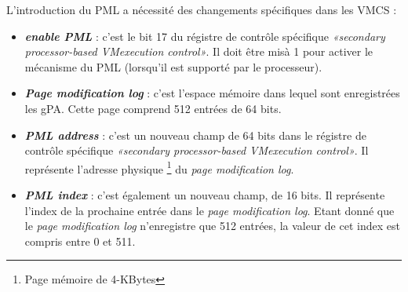 \par\noindent L'introduction du PML a nécessité des changements spécifiques dans les \acs{VMCS}
 : 
\begin{itemize}
    \item \textit{\textbf{enable PML}} : c'est le bit 17 du régistre de contrôle spécifique \textit{«secondary processor-based VMexecution control»}. Il doit être misà 1 pour activer le mécanisme du PML (lorsqu'il est supporté par le processeur).
    \item \textit{\textbf{Page modification log}} : c'est l'espace mémoire dans lequel sont enregistrées les \acs{gPA}. Cette page comprend 512 entrées de 64 bits.
    \item \textit{\textbf{PML address}} : c'est un nouveau champ de 64 bits dans le régistre de contrôle spécifique \textit{«secondary processor-based VMexecution control»}. Il représente l'adresse physique \footnote{Page mémoire de 4-KBytes} du \textit{page modification log}.
    \item \textit{\textbf{PML index}} : c'est également un nouveau champ, de 16 bits. Il représente l'index de la prochaine entrée dans le \textit{page modification log}. Etant donné que le \textit{page modification log} n'enregistre que 512 entrées, la valeur de cet index est compris entre 0 et 511.
\end{itemize}